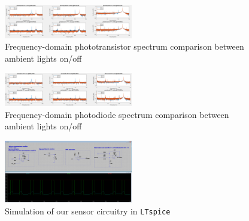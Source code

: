 \documentclass[conference]{IEEEtran}
\begin{document}
\begin{figure}[htbp]
	\centerline{\includegraphics[width=0.5\textwidth]{sensor-phototransistor-sensitivity.png}}
	\caption{Frequency-domain phototransistor spectrum comparison between ambient lights on/off}
	\label{fig:sensor-phototransistor-sensitivity}
\end{figure}
\begin{figure}[htbp]
	\centerline{\includegraphics[width=0.5\textwidth]{sensor-photodiode-sensitivity.png}}
	\caption{Frequency-domain photodiode spectrum comparison between ambient lights on/off}
	\label{fig:sensor-photodiode-sensitivity}
\end{figure}

\begin{figure}[htbp]
	\centerline{\includegraphics[width=0.5\textwidth]{sensor-spice.png}}
	\caption{Simulation of our sensor circuitry in \texttt{LTspice}}
	\label{fig:sensor-spice}
\end{figure}
\end{document}
